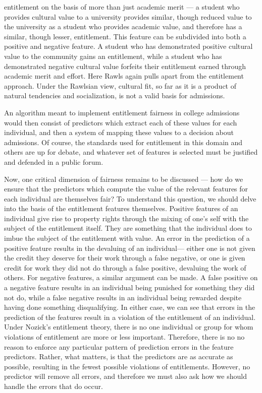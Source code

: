 \begin{itemize}
    entitlement on the basis of more than just academic merit — a student who
    provides cultural value to a university provides similar, though reduced
    value to the university as a student who provides academic value, and
    therefore has a similar, though lesser, entitlement. This feature can be
    subdivided into both a positive and negative feature. A student who has 
    demonstrated positive cultural value to the community gains an entitlement,
    while a student who has demonstrated negative cultural value forfeits their
    entitlement earned through academic merit and effort. Here Rawls again pulls
    apart from the entitlement approach. Under the Rawlsian view, cultural fit,
    so far as it is a product of natural tendencies and socialization, is not a
    valid basis for admissions.
\end{itemize}
An algorithm meant to implement entitlement fairness in college admissions
would then consist of predictors which extract each of these values for each
individual, and then a system of mapping these values to a decision about
admissions. Of course, the standards used for entitlement in this domain and
others are up for debate, and whatever set of features is selected must be
justified and defended in a public forum.

Now, one critical dimension of fairness remains to be discussed — how do we
ensure that the predictors which compute the value of the relevant features for
each individual are themselves fair? To understand this question, we should
delve into the basis of the entitlement features themselves. Positive features
of an individual give rise to property rights through the mixing of one's self 
with the subject of the entitlement itself. They are something that the
individual does to imbue the subject of the entitlement with value. An error in
the prediction of a positive feature results in the devaluing of an individual—
either one is not given the credit they deserve for their work through a false
negative, or one is given credit for work they did not do through a false
positive, devaluing the work of others. For negative features, a similar 
argument can be made. A false positive on a negative feature results in an
individual being punished for something they did not do, while a false
negative results in an individual being rewarded despite having done something
disqualifying. In either case, we can see that errors in the prediction of 
the features result in a violation of the entitlement of an individual. Under 
Nozick's entitlement theory, there is no one individual or group for whom 
violations of entitlement are more or less important. Therefore, there is no
no reason to enforce any particular pattern of prediction errors in the
feature predictors. Rather, what matters, is that the predictors are as accurate
as possible, resulting in the fewest possible violations of entitlements.
However, no predictor will remove all errors, and therefore we must also ask how
we should handle the errors that do occur.

